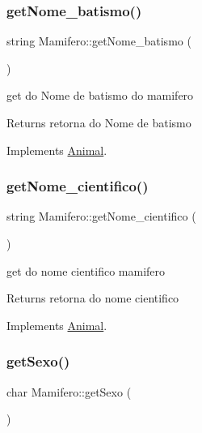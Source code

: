 \subsubsection{\texorpdfstring{getNome\_batismo()}{getNome\_batismo()}}
{\footnotesize\ttfamily string Mamifero\+::get\+Nome\+\_\+batismo (\begin{DoxyParamCaption}{ }\end{DoxyParamCaption})\hspace{0.3cm}{\ttfamily [virtual]}}



get do Nome de batismo do mamifero 

\begin{DoxyReturn}{Returns}
retorna do Nome de batismo 
\end{DoxyReturn}


Implements \mbox{\hyperlink{class_animal}{Animal}}.

\mbox{\label{class_mamifero_a5b1fc11777727a972a339cc0f3af0425}} 
\subsubsection{\texorpdfstring{getNome\_cientifico()}{getNome\_cientifico()}}
{\footnotesize\ttfamily string Mamifero\+::get\+Nome\+\_\+cientifico (\begin{DoxyParamCaption}{ }\end{DoxyParamCaption})\hspace{0.3cm}{\ttfamily [virtual]}}



get do nome cientifico mamifero 

\begin{DoxyReturn}{Returns}
retorna do nome cientifico 
\end{DoxyReturn}


Implements \mbox{\hyperlink{class_animal}{Animal}}.

\mbox{\label{class_mamifero_ad56b34c987136bc96f15c599e874eb6e}} 
\subsubsection{\texorpdfstring{getSexo()}{getSexo()}}
{\footnotesize\ttfamily char Mamifero\+::get\+Sexo (\begin{DoxyParamCaption}{ }\end{DoxyParamCaption})\hspace{0.3cm}{\ttfamily [virtual]}}



